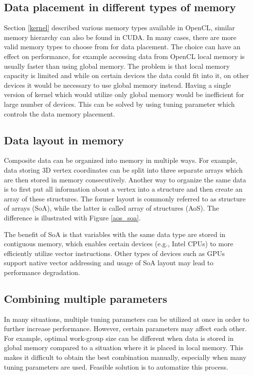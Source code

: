 \documentclass
[
    digital, %
    oneside, %
    table, %
    nolof, %
    nolot, %
    nocover %
]{fithesis3}
\begin{document}
\subsection{Data placement in different types of memory}
Section \ref{kernel} described various memory types available in OpenCL, similar memory hierarchy can also be found in CUDA. In many cases, there are
more valid memory types to choose from for data placement. The choice can have an effect on performance, for example accessing data from OpenCL local
memory is usually faster than using global memory. The problem is that local memory capacity is limited and while on certain devices the data could
fit into it, on other devices it would be necessary to use global memory instead. Having a single version of kernel which would utilize only global
memory would be inefficient for large number of devices. This can be solved by using tuning parameter which controls the data memory placement.

\subsection{Data layout in memory}
Composite data can be organized into memory in multiple ways. For example, data storing 3D vertex coordinates can be split into three separate arrays
which are then stored in memory consecutively. Another way to organize the same data is to first put all information about a vertex into a structure and
then create an array of these structures. The former layout is commonly referred to as structure of arrays (SoA), while the latter is called array
of structures (AoS). The difference is illustrated with Figure \ref{aos_soa}.

The benefit of SoA is that variables with the same data type are stored in contiguous memory, which enables certain devices (e.g., Intel CPUs) to more
efficiently utilize vector instructions. Other types of devices such as GPUs support native vector addressing and usage of SoA layout may lead to
performance degradation.

\subsection{Combining multiple parameters}
In many situations, multiple tuning parameters can be utilized at once in order to further increase performance. However, certain parameters may affect
each other. For example, optimal work-group size can be different when data is stored in global memory compared to a situation where it is placed in
local memory. This makes it difficult to obtain the best combination manually, especially when many tuning parameters are used. Feasible solution is to
automatize this process.
\end{document}
